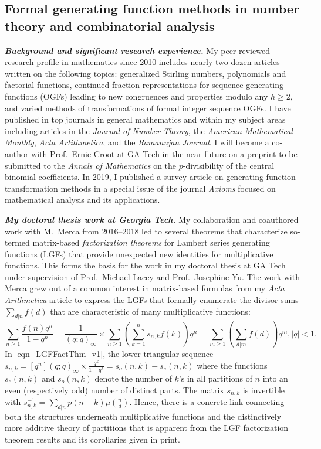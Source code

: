 \documentclass[10pt,reqno,letterpaper]{article}
\theoremstyle{plain}
\numberwithin{theorem}{section}
\theoremstyle{definition}
\begin{document}
\subsection{Formal generating function methods in number theory and combinatorial analysis}

\noindent
{\small \textbf{\emph{Background and significant research experience.}}} 
My peer-reviewed research profile in mathematics since 2010 includes nearly two 
dozen articles written on the 
following topics: generalized Stirling numbers, polynomials and factorial functions, 
continued fraction representations for sequence generating functions (OGFs) leading to 
new congruences and properties modulo any $h \geq 2$, 
and varied methods of transformations of formal integer sequence OGFs.  
I have published in top journals in general mathematics and within my subject 
areas including articles in the \emph{Journal of Number Theory}, 
the \emph{American Mathematical Monthly}, \emph{Acta Artithmetica}, and the 
\emph{Ramanujan Journal}. 
I will become a co-author with 
Prof.~Ernie Croot at GA Tech in the near future on a preprint to be submitted to the 
\emph{Annals of Mathematics} on the $p$-divisibility of the 
central binomial coefficients. 
In 2019, I published a survey article on 
generating function transformation methods 
in a special issue of the journal \emph{Axioms} focused on 
mathematical analysis and its applications. 

\noindent
{\small \textbf{\emph{My doctoral thesis work at Georgia Tech.}}} 
My collaboration and coauthored work with M.~Merca from 2016--2018 
led to several theorems that characterize 
so-termed matrix-based \emph{factorization theorems} for Lambert series generating functions (LGFs) 
that provide unexpected new identities for multiplicative functions. 
This forms the basis for the work in my doctoral thesis 
at GA Tech under supervision of Prof.~Michael Lacey and Prof.~Josephine Yu. 
The work with Merca grew out of a common interest in matrix-based formulas from my 
\emph{Acta Arithmetica} article \cite{MDS-NO-7} to express the 
LGFs that formally enumerate the divisor sums $\sum_{d|n} f(d)$ that are characteristic of many 
multiplicative functions: 
\begin{equation}
\label{eqn_LGFFactThm_v1} 
\sum_{n \geq 1} \frac{f(n)q^n}{1-q^n} = \frac{1}{(q; q)_{\infty}} \times \sum_{n \geq 1} \left( 
     \sum_{k=1}^{n} s_{n,k} f(k)\right) q^n = 
     \sum_{m \geq 1} \left(\sum_{d|m} f(d)\right) q^m, |q| < 1. 
\end{equation}
In \eqref{eqn_LGFFactThm_v1}, the lower triangular sequence 
$s_{n,k} = [q^n](q; q)_{\infty} \times \frac{q^k}{1-q^k} = s_o(n, k) - s_e(n, k)$ where 
the functions $s_e(n, k)$ and $s_o(n, k)$ denote the number of $k$'s in all 
partitions of $n$ into an even (respectively odd) number of distinct parts. The matrix $s_{n,k}$ is 
invertible with $s_{n,k}^{-1} = \sum_{d|n} p(n-k) \mu\left(\frac{n}{d}\right)$. 
Hence, there is a concrete link connecting both the structures underneath 
multiplicative functions and the distinctively more additive theory of partitions that is 
apparent from the LGF factorization theorem results and its corollaries given in print. 
\end{document}
